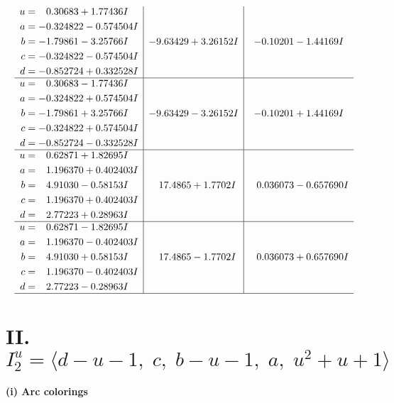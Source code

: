 \documentclass[1p]{elsarticle_modified}
\theoremstyle{definition}
\begin{document}
$$\begin{array}{c|c|c}
\begin{aligned}
u &= \phantom{-}0.30683 + 1.77436 I \\
a &= -0.324822 - 0.574504 I \\
b &= -1.79861 - 3.25766 I \\
c &= -0.324822 - 0.574504 I \\
d &= -0.852724 + 0.332528 I\end{aligned}
 & -9.63429 + 3.26152 I & -0.10201 - 1.44169 I \\ \hline\begin{aligned}
u &= \phantom{-}0.30683 - 1.77436 I \\
a &= -0.324822 + 0.574504 I \\
b &= -1.79861 + 3.25766 I \\
c &= -0.324822 + 0.574504 I \\
d &= -0.852724 - 0.332528 I\end{aligned}
 & -9.63429 - 3.26152 I & -0.10201 + 1.44169 I \\ \hline\begin{aligned}
u &= \phantom{-}0.62871 + 1.82695 I \\
a &= \phantom{-}1.196370 + 0.402403 I \\
b &= \phantom{-}4.91030 - 0.58153 I \\
c &= \phantom{-}1.196370 + 0.402403 I \\
d &= \phantom{-}2.77223 + 0.28963 I\end{aligned}
 & \phantom{-}17.4865 + 1.7702 I & \phantom{-}0.036073 - 0.657690 I \\ \hline\begin{aligned}
u &= \phantom{-}0.62871 - 1.82695 I \\
a &= \phantom{-}1.196370 - 0.402403 I \\
b &= \phantom{-}4.91030 + 0.58153 I \\
c &= \phantom{-}1.196370 - 0.402403 I \\
d &= \phantom{-}2.77223 - 0.28963 I\end{aligned}
 & \phantom{-}17.4865 - 1.7702 I & \phantom{-}0.036073 + 0.657690 I\\
 \hline 
 \end{array}$$\newpage\newpage\renewcommand{\arraystretch}{1}
\centering \section*{II. $I^u_{2}= \langle d- u-1,\;c,\;b- u-1,\;a,\;u^2+u+1 \rangle$}
\flushleft \textbf{(i) Arc colorings}\\
\end{document}
